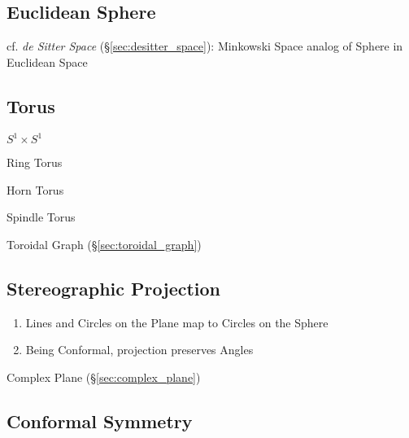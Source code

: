 \subsection{Euclidean Sphere}\label{sec:euclidean_sphere}

cf. \emph{de Sitter Space} (\S\ref{sec:desitter_space}): Minkowski Space analog
of Sphere in Euclidean Space



\subsection{Torus}\label{sec:torus}

$S^1 \times S^1$

Ring Torus

Horn Torus

Spindle Torus

\fist Toroidal Graph (\S\ref{sec:toroidal_graph})



\subsection{Stereographic Projection}\label{sec:stereographic_projection}

\begin{enumerate}
  \item Lines and Circles on the Plane map to Circles on the Sphere
  \item Being Conformal, projection preserves Angles
\end{enumerate}

Complex Plane (\S\ref{sec:complex_plane})



\subsection{Conformal Symmetry}\label{sec:conformal_symmetry}

